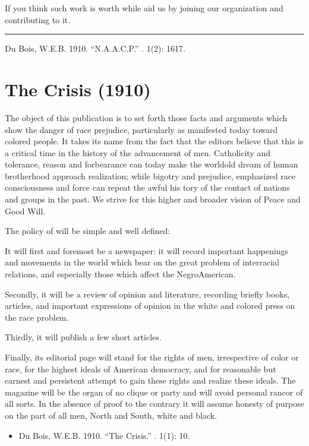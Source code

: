 \documentclass[letterpaper,10pt,english]{jupyterBook}
\begin{document}
\sphinxAtStartPar
If you think such work is worth while aid us by joining our organization and contributing to it.


\bigskip\hrule\bigskip


\sphinxAtStartPar
{} Du Bois, W.E.B. 1910. “N.A.A.C.P.”  . 1(2): 16\sphinxhyphen{}17.


\section{The Crisis (1910)}
\label{\detokenize{Volumes/01/01/TheCrisis:the-crisis-1910}}\label{\detokenize{Volumes/01/01/TheCrisis::doc}}
\sphinxAtStartPar
The object of this publication is to set forth those facts and arguments which show the danger of race prejudice, particularly as manifested to\sphinxhyphen{}day toward colored people. It takes its name from the fact that the editors believe that this is a critical time in the history of the advancement of men. Catholicity and tolerance, reason and forbearance can to\sphinxhyphen{}day make the world\sphinxhyphen{}old dream of human brotherhood approach realization; while bigotry and prejudice, emphasized race consciousness and force can repeat the awful his tory of the contact of nations and groups in the past. We strive for this higher and broader vision of Peace and Good Will.

\sphinxAtStartPar
The policy of  will be simple and well defined:

\sphinxAtStartPar
It will first and foremost be a newspaper: it will record important happenings and movements in the world which bear on the great problem of inter\sphinxhyphen{}racial relations, and especially those which affect the Negro\sphinxhyphen{}American.

\sphinxAtStartPar
Secondly, it will be a review of opinion and literature, recording briefly books, articles, and important expressions of opinion in the white and colored press on the race problem.

\sphinxAtStartPar
Thirdly, it will publish a few short articles.

\sphinxAtStartPar
Finally, its editorial page will stand for the rights of men, irrespective of color or race, for the highest ideals of American democracy, and for reasonable but earnest and persistent attempt to gain these rights and realize these ideals. The magazine will be the organ of no clique or party and will avoid personal rancor of all sorts. In the absence of proof to the contrary it will assume honesty of purpose on the part of all men, North and South, white and black.
\begin{itemize}
\item {} 
\sphinxAtStartPar
Du Bois, W.E.B. 1910. “The Crisis.” . 1(1): 10.

\end{itemize}
\end{document}
